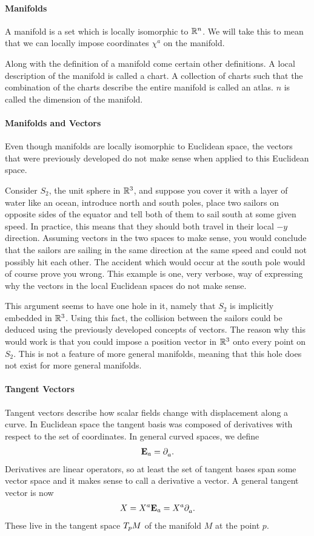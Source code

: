 \paragraph{Manifolds}
A manifold is a set which is locally isomorphic to $\mathbb{R}^{n}$. We will take this to mean that we can locally impose coordinates $\chi^{a}$ on the manifold.

Along with the definition of a manifold come certain other definitions. A local description of the manifold is called a chart. A collection of charts such that the combination of the charts describe the entire manifold is called an atlas. $n$ is called the dimension of the manifold.

\paragraph{Manifolds and Vectors}
Even though manifolds are locally isomorphic to Euclidean space, the vectors that were previously developed do not make sense when applied to this Euclidean space.

Consider $S_{2}$, the unit sphere in $\mathbb{R}^{3}$, and suppose you cover it with a layer of water like an ocean, introduce north and south poles, place two sailors on opposite sides of the equator and tell both of them to sail south at some given speed. In practice, this means that they should both travel in their local $-y$ direction. Assuming vectors in the two spaces to make sense, you would conclude that the sailors are sailing in the same direction at the same speed and could not possibly hit each other. The accident which would occur at the south pole would of course prove you wrong. This example is one, very verbose, way of expressing why the vectors in the local Euclidean spaces do not make sense.

This argument seems to have one hole in it, namely that $S_{2}$ is implicitly embedded in $\mathbb{R}^{3}$. Using this fact, the collision between the sailors could be deduced using the previously developed concepts of vectors. The reason why this would work is that you could impose a position vector in $\mathbb{R}^{3}$ onto every point on $S_{2}$. This is not a feature of more general manifolds, meaning that this hole does not exist for more general manifolds.

\paragraph{Tangent Vectors}
Tangent vectors describe how scalar fields change with displacement along a curve. In Euclidean space the tangent basis was composed of derivatives with respect to the set of coordinates. In general curved spaces, we define
\begin{align*}
	\vb{E}_{a} = \partial^{}_{a}.
\end{align*}
Derivatives are linear operators, so at least the set of tangent bases span some vector space and it makes sense to call a derivative a vector. A general tangent vector is now
\begin{align*}
	X = X^{a}\vb{E}_{a} = X^{a}\partial^{}_{a}.
\end{align*}
These live in the tangent space $T_{p}M$ of the manifold $M$ at the point $p$.

